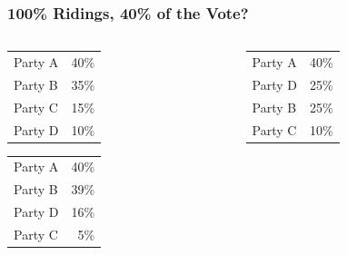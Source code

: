 \documentclass[14pt,t,hyperref={colorlinks=true,urlcolor=red}]{beamer}
\begin{document}
\begin{frame}
\begin{columns}
\begin{column}{0.45\textwidth}
\end{column} %

\end{columns} 

\end{frame} %


\begin{frame} %
\frametitle{100\% Ridings, 40\% of the Vote?}

\begin{columns} 

\begin{column}{0.45\textwidth} %

\begin{block}{}
\begin{center}
\begin{tabular} {lr}
\alert{Party A} & \alert{40\%} \\
Party B  & 35\% \\
Party C  & 15\% \\
Party D  & 10\% \\
\end{tabular}
\end{center}
\end{block}

\begin{block}{}
\begin{center}
\begin{tabular} {lr}
\alert{Party A} & \alert{40\%} \\
Party B  & 39\% \\
Party D  & 16\% \\
Party C  &  5\% \\
\end{tabular}
\end{center}
\end{block}

\end{column} %

\begin{column}{0.45\textwidth} %

\begin{block}{}
\begin{center}
\begin{tabular} {lr}
\alert{Party A} & \alert{40\%} \\
Party D  & 25\% \\
Party B  & 25\% \\
Party C  & 10\% \\
\end{tabular}
\end{center}
\end{block}


\end{column}
\end{columns}
\end{frame}
\end{document}
